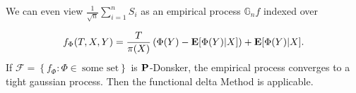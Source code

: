We can even view
$
\frac{1}{\sqrt{n}}
\sum_{i=1}^{n}S_i 
$
as an empirical process 
$
\mathbb{G}_n f
$
indexed over 

\begin{gather}
  f_\Phi(T,X,Y)
  =
  \frac{T}{\pi(X)}
 \left( 
   \Phi(Y) - \E [ \Phi(Y) | X ]
 \right)
 +
   \E [ \Phi(Y) | X ] 
   .
\end{gather}
If $\mathcal{F}=\left\{ f_\Phi \colon \Phi \in \ \text{some set}\right\}$
is $\P$-Donsker, the empirical process converges to a tight gaussian process.
Then the functional delta Method is applicable.


